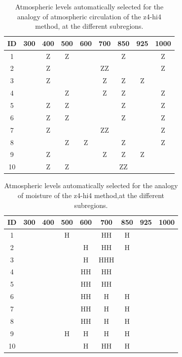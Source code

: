 \documentclass{ametsoc}
\begin{document}
\begin{table}[htbp]
	\footnotesize
	\caption{Atmospheric levels automatically selected for the analogy of atmospheric circulation of the z4-hi4 method, at the different subregions.}
	\begin{center}
		\begin{tabular}{ccccccccc}
			\hline \textbf{ID} & \textbf{300} & \textbf{400} & \textbf{500} & \textbf{600} & \textbf{700} & \textbf{850} & \textbf{925} & \textbf{1000} \\ 
			\hline 
			1  &   & Z & Z &   &   & Z &   & Z \\
			2  &   & Z &   &   & ZZ &   &   & Z \\
			3  &   & Z &   &   & Z & Z & Z &   \\
			4  &   &   & Z &   & Z & Z &   & Z \\
			5  &   & Z & Z &   &   & Z &   & Z \\
			6  &   & Z & Z &   &   & Z &   & Z \\
			7  &   & Z &   &   & ZZ &   &   & Z \\
			8  &   &   & Z & Z &   & Z &   & Z \\
			9  &   & Z &   &   & Z & Z & Z &   \\
			10 &   & Z & Z &   &   & ZZ &   &   \\
			\hline 
		\end{tabular} 
	\end{center}
	\label{table:levels_GA_z4_hi4}
\end{table}

\begin{table}[htbp]
	\footnotesize
	\caption{Atmospheric levels automatically selected for the analogy of moisture of the z4-hi4 method,at the different subregions.}
	\begin{center}
		\begin{tabular}{ccccccccc}
			\hline \textbf{ID} & \textbf{300} & \textbf{400} & \textbf{500} & \textbf{600} & \textbf{700} & \textbf{850} & \textbf{925} & \textbf{1000} \\ 
			\hline 
			1  &   &   & H &   & HH & H &   &   \\
			2  &   &   &   & H & HH & H &   &   \\
			3  &   &   &   & H & HHH &   &   &   \\
			4  &   &   &   & HH & HH &   &   &   \\
			5  &   &   &   & HH & HH &   &   &   \\
			6  &   &   &   & HH & H & H &   &   \\
			7  &   &   &   & HH & H & H &   &   \\
			8  &   &   &   & HH & H & H &   &   \\
			9  &   &   & H & H & H & H &   &   \\
			10 &   &   &   & H & HH & H &   &   \\
			\hline 
		\end{tabular} 
	\end{center}
	\label{table:levels_GA_z4_hi4_H}
\end{table}
\end{document}

